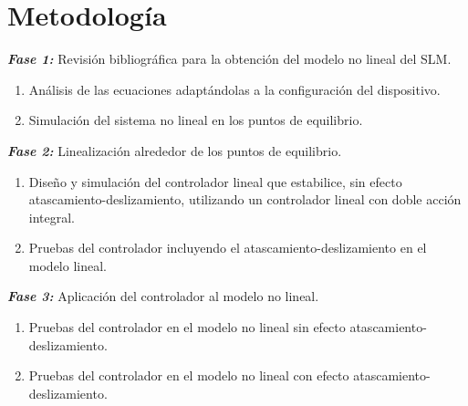 \chapter{Metodología}\label{chap:metodologia}

\begin{sloppypar}
\textbf{\textit{Fase 1:}} Revisión bibliográfica para la obtención del modelo no lineal del SLM.

\begin{enumerate}
  \item[a)] Análisis de las ecuaciones adaptándolas a la configuración del dispositivo.
  \item[b)] Simulación del sistema no lineal en los puntos de equilibrio.
\end{enumerate}

\textbf{\textit{Fase 2:}} Linealización alrededor de los puntos de equilibrio.

\begin{enumerate}
  \item[a)] Diseño y simulación del controlador lineal que estabilice, sin efecto atascamiento-deslizamiento, utilizando un controlador lineal con doble acción integral.
  \item[b)] Pruebas del controlador incluyendo el atascamiento-deslizamiento en el modelo lineal.
\end{enumerate}

\textbf{\textit{Fase 3:}} Aplicación del controlador al modelo no lineal.

\begin{enumerate}
  \item[a)] Pruebas del controlador en el modelo no lineal sin efecto atascamiento-deslizamiento.
  \item[b)] Pruebas del controlador en el modelo no lineal con efecto atascamiento-deslizamiento.
\end{enumerate}
\end{sloppypar}
